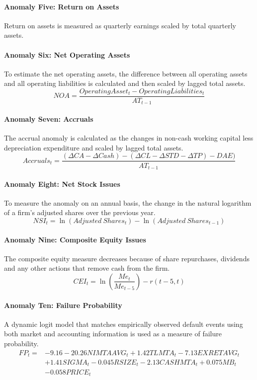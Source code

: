 \documentclass[12pt, a4paper, oneside]{article}
\begin{document}
\paragraph*{Anomaly Five: Return on Assets}
Return on assets is measured as quarterly earnings scaled by total quarterly assets. 

\paragraph*{Anomaly Six: Net Operating Assets}
To estimate the net operating assets, the difference between all operating assets and all operating liabilities is calculated and then scaled by lagged total assets.
\[
NOA= \frac{Operating Asset_t-Operating Liabilities_t}{AT_{t-1}}\]

\paragraph*{Anomaly Seven: Accruals}
The accrual anomaly is calculated as the changes in non-cash working capital less depreciation expenditure and scaled by lagged total assets.
\[
Accruals_t = \frac{(\Delta CA - \Delta Cash) - (\Delta CL -\Delta STD -\Delta TP)-DAE)}{AT_{t-1}}
\]

\paragraph*{Anomaly Eight: Net Stock Issues}
To measure the anomaly on an annual basis, the change in the natural logarithm of a firm’s adjusted shares over the previous year. 
\[
NSI_t = \ln (Adjusted \ Shares_t ) - \ln ( Adjusted \ Shares_{t-1})
\]

\paragraph*{Anomaly Nine: Composite Equity Issues}
The composite equity measure decreases because of share repurchases, dividends and any other actions that remove cash from the firm. 
\[
CEI_t = \ln (\frac{Me_t}{Me_{t-5}})  - r(t - 5,t)
\]

\paragraph*{Anomaly Ten: Failure Probability }
A dynamic logit model that matches empirically observed default events using both market and accounting information is used as a measure of failure probability. 
\begin{align*}
    FP_t =  &- 9.16 - 20.26 NIMTAAVG_t+ 1.42 TLMTA_t  - 7.13 EXRETAVG_t \\
    &+ 1.41 SIGMA_t  - 0.045 RSIZE_t - 2.13 CASHMTA_t + 0.075 MB_t \\
    &- 0.058 PRICE_t
\end{align*}
\end{document}
